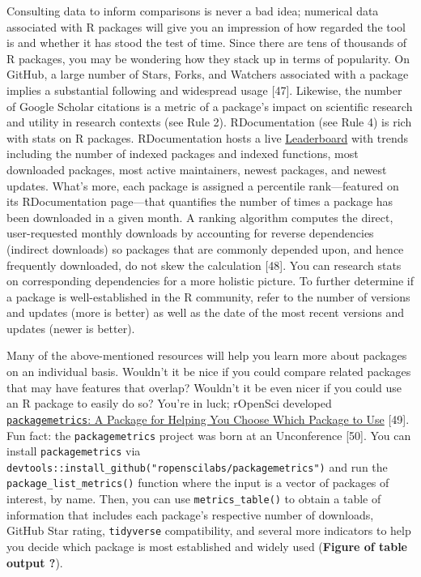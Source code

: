 \documentclass[10pt,letterpaper]{article}
\begin{document}
Consulting data to inform comparisons is never a bad idea; numerical
data associated with R packages will give you an impression of how
regarded the tool is and whether it has stood the test of time. Since
there are tens of thousands of R packages, you may be wondering how they
stack up in terms of popularity. On GitHub, a large number of Stars,
Forks, and Watchers associated with a package implies a substantial
following and widespread usage {[}47{]}. Likewise, the number of Google
Scholar citations is a metric of a package's impact on scientific
research and utility in research contexts (see Rule 2). RDocumentation
(see Rule 4) is rich with stats on R packages. RDocumentation hosts a
live \href{https://www.rdocumentation.org/trends}{Leaderboard} with
trends including the number of indexed packages and indexed functions,
most downloaded packages, most active maintainers, newest packages, and
newest updates. What's more, each package is assigned a percentile
rank---featured on its RDocumentation page---that quantifies the number
of times a package has been downloaded in a given month. A ranking
algorithm computes the direct, user-requested monthly downloads by
accounting for reverse dependencies (indirect downloads) so packages
that are commonly depended upon, and hence frequently downloaded, do not
skew the calculation {[}48{]}. You can research stats on corresponding
dependencies for a more holistic picture. To further determine if a
package is well-established in the R community, refer to the number of
versions and updates (more is better) as well as the date of the most
recent versions and updates (newer is better).

Many of the above-mentioned resources will help you learn more about
packages on an individual basis. Wouldn't it be nice if you could
compare related packages that may have features that overlap? Wouldn't
it be even nicer if you could use an R package to easily do so? You're
in luck; rOpenSci developed
\href{https://docs.ropensci.org/packagemetrics/}{\texttt{packagemetrics}:
A Package for Helping You Choose Which Package to Use} {[}49{]}. Fun
fact: the \texttt{packagemetrics} project was born at an Unconference
{[}50{]}. You can install \texttt{packagemetrics} via
\texttt{devtools::install\_github("ropenscilabs/packagemetrics")} and
run the \texttt{package\_list\_metrics()} function where the input is a
vector of packages of interest, by name. Then, you can use
\texttt{metrics\_table()} to obtain a table of information that includes
each package's respective number of downloads, GitHub Star rating,
\texttt{tidyverse} compatibility, and several more indicators to help
you decide which package is most established and widely used
(\textbf{Figure of table output ?}).
\end{document}
